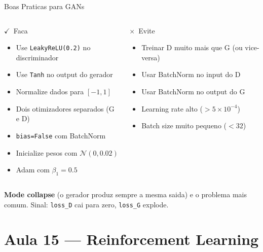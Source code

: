 \documentclass[aspectratio=169, 10pt]{beamer}
\newcommand{\faCheck}{$\checkmark$}
\newcommand{\faTimes}{$\times$}
\begin{document}

\begin{frame}{Boas Praticas para GANs}
\begin{columns}
\begin{block}{\faCheck\ Faca}
  \begin{itemize}
    \item Use \texttt{LeakyReLU(0.2)} no discriminador
    \item Use \texttt{Tanh} no output do gerador
    \item Normalize dados para $[-1, 1]$
    \item Dois otimizadores separados (G e D)
    \item \texttt{bias=False} com BatchNorm
    \item Inicialize pesos com $\mathcal{N}(0, 0.02)$
    \item Adam com $\beta_1=0.5$
  \end{itemize}
\end{block}

\begin{alertblock}{\faTimes\ Evite}
  \begin{itemize}
    \item Treinar D muito mais que G (ou vice-versa)
    \item Usar BatchNorm no input do D
    \item Usar BatchNorm no output do G
    \item Learning rate alto ($> 5 \times 10^{-4}$)
    \item Batch size muito pequeno ($< 32$)
  \end{itemize}
\end{alertblock}
\end{columns}

\vspace{0.4em}
\begin{destaque}
  \textbf{Mode collapse} (o gerador produz sempre a mesma saida) e o problema mais comum. 
  Sinal: \texttt{loss\_D} cai para zero, \texttt{loss\_G} explode.
\end{destaque}
\end{frame}

\section{Aula 15 — Reinforcement Learning}
\end{document}
